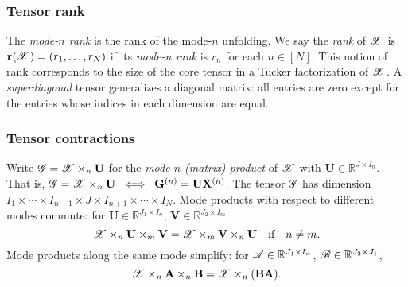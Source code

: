 \subsubsection{Tensor rank}
The \textit{mode-$n$ rank} is the rank of the mode-$n$ unfolding.
We say the \textit{rank} of $\T{X}$ is
$\mathbf{r}(\T{X}) = (r_1,\dots, r_N)$ if its \textit{mode-n rank} is $r_n$ for each $n\in [N]$.
This notion of rank corresponds to the size of the core tensor in a Tucker factorization
of $\T{X}$.
A \emph{superdiagonal} tensor generalizes a diagonal matrix:
all entries are zero except for the entries
whose indices in each dimension are equal.

\subsubsection{Tensor contractions}
Write $\T{G} =\T{X} \times_n \mathbf{U}$ for the \textit{mode-$n$ (matrix) product}
of $\T{X}$ with $\mathbf{U} \in \mathbb{R}^{J \times I_n}$.
That is, $\T{G} =\T{X} \times_n \mathbf{U} \; \iff \; \mathbf{G}^{(n)} = \mathbf{U}\mathbf{X}^{(n)}$.
The tensor $\T{G}$ has dimension $I_1 \times \cdots \times I_{n-1} \times J \times I_{n+1} \times \cdots \times I_N$.
Mode products with respect to different modes commute:
for $\mathbf{U} \in \mathbb{R}^{J_1 \times I_n}$, $\mathbf{V} \in \mathbb{R}^{J_2 \times I_m}$
\[
\T{X} \times_n \mathbf{U} \times_m \mathbf{V} = \T{X} \times_m \mathbf{V} \times_n \mathbf{U}
\quad \text{if} \quad n \ne m.
\]
Mode products along the same mode simplify:
for $\T{A} \in \mathbb{R}^{J_1 \times I_n}$, $\T{B} \in \mathbb{R}^{J_2 \times J_1}$,
\[
\label{eq: tensor_product_association}
\T{X}\times_n \mathbf{A} \times_n \mathbf{B} = \T{X}\times_n (\mathbf{BA}).
\]

